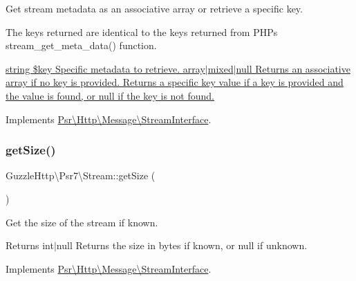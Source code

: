 Get stream metadata as an associative array or retrieve a specific key.

The keys returned are identical to the keys returned from P\+HP\textquotesingle{}s stream\+\_\+get\+\_\+meta\+\_\+data() function.

\hyperlink{}{string \$key Specific metadata to retrieve.  array$\vert$mixed$\vert$null Returns an associative array if no key is provided. Returns a specific key value if a key is provided and the value is found, or null if the key is not found. }

Implements \hyperlink{interfacePsr_1_1Http_1_1Message_1_1StreamInterface_ac5e77fbbc7ba4235a4041d966f3aaa84}{Psr\textbackslash{}\+Http\textbackslash{}\+Message\textbackslash{}\+Stream\+Interface}.

\mbox{\label{classGuzzleHttp_1_1Psr7_1_1Stream_ac6f693e5cb59c136d0808117aab61396}} 
\subsubsection{\texorpdfstring{get\+Size()}{getSize()}}
{\footnotesize\ttfamily Guzzle\+Http\textbackslash{}\+Psr7\textbackslash{}\+Stream\+::get\+Size (\begin{DoxyParamCaption}{ }\end{DoxyParamCaption})}

Get the size of the stream if known.

\begin{DoxyReturn}{Returns}
int$\vert$null Returns the size in bytes if known, or null if unknown. 
\end{DoxyReturn}


Implements \hyperlink{interfacePsr_1_1Http_1_1Message_1_1StreamInterface_a85b9ff28e3ee39d95a47e623d866cf76}{Psr\textbackslash{}\+Http\textbackslash{}\+Message\textbackslash{}\+Stream\+Interface}.

\mbox{\label{classGuzzleHttp_1_1Psr7_1_1Stream_aab579a16dc9a78166538a6d2d6c00e1b}} 
